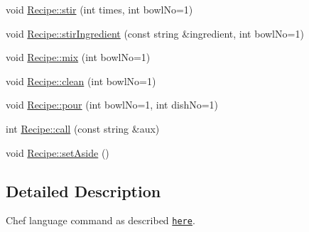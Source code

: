 \begin{DoxyCompactItemize}
void \hyperlink{group__Command_ga5b48c67eb04fc71c199bdf611c387c9e}{Recipe\-::stir} (int times, int bowl\-No=1)
\item 
void \hyperlink{group__Command_ga2678e5c7db062e186ca947018050f5c2}{Recipe\-::stir\-Ingredient} (const string \&ingredient, int bowl\-No=1)
\item 
void \hyperlink{group__Command_gad9a02b3a48b606ba17dc91337c3f64c2}{Recipe\-::mix} (int bowl\-No=1)
\item 
void \hyperlink{group__Command_gae041e0eb15d1e40fe513b53803810dac}{Recipe\-::clean} (int bowl\-No=1)
\item 
void \hyperlink{group__Command_ga03848074a9e527439e6381e47d9f3749}{Recipe\-::pour} (int bowl\-No=1, int dish\-No=1)
\item 
int \hyperlink{group__Command_ga2485acb9291f44d16222f15a75ff27fb}{Recipe\-::call} (const string \&aux)
\item 
void \hyperlink{group__Command_ga4889710ccae668fb039e4dfa0ea2dae7}{Recipe\-::set\-Aside} ()
\end{DoxyCompactItemize}


\subsection{Detailed Description}
Chef language command as described \href{http://www.dangermouse.net/esoteric/chef.html}{\tt here}. 

